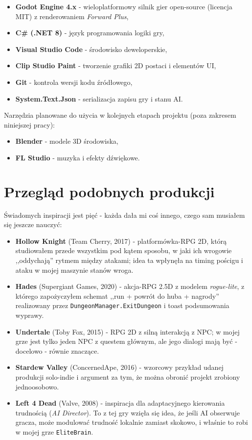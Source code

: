 \begin{itemize}
    \item \textbf{Godot Engine 4.x} - wieloplatformowy silnik gier open-source (licencja MIT) z renderowaniem \textit{Forward Plus},
    \item \textbf{C\# (.NET 8)} - język programowania logiki gry,
    \item \textbf{Visual Studio Code} - środowisko deweloperskie,
    \item \textbf{Clip Studio Paint} - tworzenie grafiki 2D postaci i elementów UI,
    \item \textbf{Git} - kontrola wersji kodu źródłowego,
    \item \textbf{System.Text.Json} - serializacja zapisu gry i stanu AI.
\end{itemize}

Narzędzia planowane do użycia w kolejnych etapach projektu (poza zakresem niniejszej pracy):
\begin{itemize}
    \item \textbf{Blender} - modele 3D środowiska,
    \item \textbf{FL Studio} - muzyka i efekty dźwiękowe.
\end{itemize}

\section{Przegląd podobnych produkcji}

Świadomych inspiracji jest pięć - każda dała mi coś innego, czego sam musiałem się jeszcze nauczyć:

\begin{itemize}
    \item \textbf{Hollow Knight} (Team Cherry, 2017) - platformówka-RPG 2D, którą studiowałem przede wszystkim pod kątem sposobu, w jaki ich wrogowie ,,oddychają'' rytmem między atakami; idea ta wpłynęła na timing pościgu i ataku w mojej maszynie stanów wroga.
    \item \textbf{Hades} (Supergiant Games, 2020) - akcja-RPG 2.5D z modelem \textit{rogue-lite}, z którego zapożyczyłem schemat ,,run + powrót do huba + nagrody'' realizowany przez \texttt{DungeonManager.ExitDungeon} i toast podsumowania wyprawy.
    \item \textbf{Undertale} (Toby Fox, 2015) - RPG 2D z silną interakcją z NPC; w mojej grze jest tylko jeden NPC z questem głównym, ale jego dialogi mają być - docelowo - równie znaczące.
    \item \textbf{Stardew Valley} (ConcernedApe, 2016) - wzorcowy przykład udanej produkcji solo-indie i argument za tym, że można obronić projekt zrobiony jednoosobowo.
    \item \textbf{Left 4 Dead} (Valve, 2008) - inspiracja dla adaptacyjnego kierowania trudnością (\textit{AI Director}). To z tej gry wzięła się idea, że jeśli AI obserwuje gracza, może modulować trudność lokalnie zamiast skokowo, i właśnie to robi w mojej grze \texttt{EliteBrain}.
\end{itemize}

